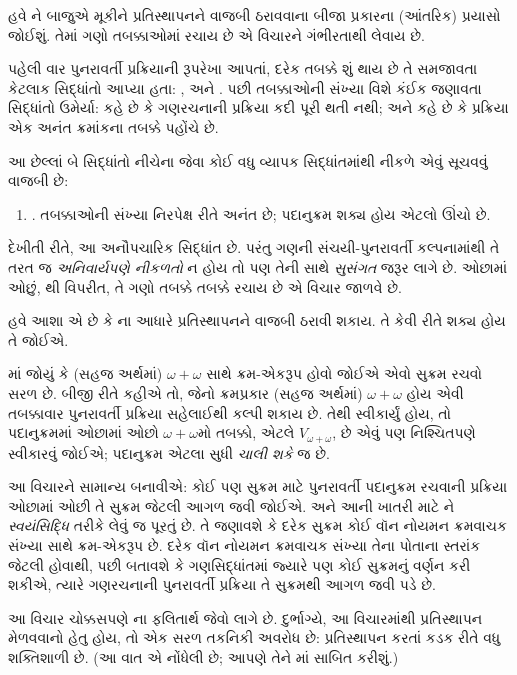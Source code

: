 \documentclass[../../../include/open-logic-section]{subfiles}
\begin{document}

હવે \limofsize{}ને બાજુએ મૂકીને પ્રતિસ્થાપનને વાજબી
ઠરાવવાના બીજા પ્રકારના (આંતરિક) પ્રયાસો જોઈશું. તેમાં
ગણો તબક્કાઓમાં રચાય છે એ વિચારને ગંભીરતાથી લેવાય છે.

પહેલી વાર પુનરાવર્તી પ્રક્રિયાની રૂપરેખા આપતાં, દરેક
તબક્કે શું થાય છે તે સમજાવતા કેટલાક સિદ્ધાંતો આપ્યા
હતા: \stageshier, \stagesord અને \stagesacc. પછી
તબક્કાઓની સંખ્યા વિશે કંઈક જણાવતા સિદ્ધાંતો ઉમેર્યા:
\stagessucc{} કહે છે કે ગણરચનાની પ્રક્રિયા કદી પૂરી
થતી નથી; અને \stagesinf{} કહે છે કે પ્રક્રિયા એક
અનંત ક્રમાંકના તબક્કે પહોંચે છે.

આ છેલ્લાં બે સિદ્ધાંતો નીચેના જેવા કોઈ વધુ વ્યાપક
સિદ્ધાંતમાંથી નીકળે એવું સૂચવવું વાજબી છે:
\begin{enumerate}
	\item[] \stagesinex. તબક્કાઓની સંખ્યા નિરપેક્ષ રીતે
	અનંત છે; પદાનુક્રમ શક્ય હોય એટલો ઊંચો છે.
\end{enumerate}
દેખીતી રીતે, આ અનૌપચારિક સિદ્ધાંત છે. પરંતુ ગણની
સંચયી-પુનરાવર્તી કલ્પનામાંથી તે તરત જ \emph{અનિવાર્યપણે
નીકળતો} ન હોય તો પણ તેની સાથે \emph{સુસંગત} જરૂર
લાગે છે. ઓછામાં ઓછું, \limofsize{}થી વિપરીત, તે
ગણો તબક્કે તબક્કે રચાય છે એ વિચાર જાળવે છે.

હવે આશા એ છે કે \stagesinex{}ના આધારે પ્રતિસ્થાપનને
વાજબી ઠરાવી શકાય. તે કેવી રીતે શક્ય હોય તે જોઈએ.

માં જોયું કે (સહજ અર્થમાં)
$\omega+\omega$ સાથે ક્રમ-એકરૂપ હોવો જોઈએ એવો સુક્રમ
રચવો સરળ છે. બીજી રીતે કહીએ તો, જેનો ક્રમપ્રકાર
(સહજ અર્થમાં) $\omega+\omega$ હોય એવી તબક્કાવાર
પુનરાવર્તી પ્રક્રિયા સહેલાઈથી કલ્પી શકાય છે. તેથી
\stagesinex{} સ્વીકાર્યું હોય, તો પદાનુક્રમમાં ઓછામાં
ઓછો $\omega+\omega$મો તબક્કો, એટલે
$V_{\omega+\omega}$, છે એવું પણ નિશ્ચિતપણે સ્વીકારવું
જોઈએ; પદાનુક્રમ એટલા સુધી \emph{ચાલી શકે} જ છે.

આ વિચારને સામાન્ય બનાવીએ: કોઈ પણ સુક્રમ માટે
પુનરાવર્તી પદાનુક્રમ રચવાની પ્રક્રિયા ઓછામાં ઓછી તે
સુક્રમ જેટલી આગળ જવી જોઈએ. અને આની ખાતરી માટે
ને
\emph{સ્વયંસિદ્ધિ} તરીકે લેવું જ પૂરતું છે. તે જણાવશે
કે દરેક સુક્રમ કોઈ વૉન નોયમન ક્રમવાચક સંખ્યા સાથે
ક્રમ-એકરૂપ છે. દરેક વૉન નોયમન ક્રમવાચક સંખ્યા તેના
પોતાના સ્તરાંક જેટલી હોવાથી,
પછી બતાવશે કે ગણસિદ્ધાંતમાં જ્યારે પણ કોઈ સુક્રમનું
વર્ણન કરી શકીએ, ત્યારે ગણરચનાની પુનરાવર્તી પ્રક્રિયા
તે સુક્રમથી આગળ જવી પડે છે.

આ વિચાર ચોક્કસપણે \stagesinex{}ના ફલિતાર્થ જેવો લાગે
છે. દુર્ભાગ્યે, આ વિચારમાંથી પ્રતિસ્થાપન મેળવવાનો હેતુ
હોય, તો એક સરળ તકનિકી અવરોધ છે: પ્રતિસ્થાપન
કરતાં કડક રીતે વધુ શક્તિશાળી છે. (આ વાત
\citet[\S13.2]{Potter2004}એ નોંધેલી છે; આપણે તેને
માં
સાબિત કરીશું.)
\end{document}
